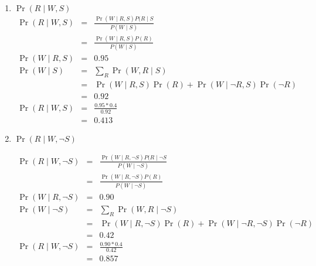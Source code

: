\documentclass[12pt]{article}
\begin{document}
\begin{enumerate}
\begin{enumerate}
\item $\Pr(R \mid W,S)$
\begin{eqnarray*}
	\Pr(R \mid W,S)  &=& \frac{\Pr(W\mid R, S) P(R\mid S}{P(W\mid S)} \\
		&=& \frac{\Pr(W\mid R, S) P(R)}{P(W\mid S)} \\
	\Pr(W\mid R, S) &=& 0.95 \\
	\Pr(W\mid S) &=& \sum_R \Pr(W,R \mid S) \\
		&=& \Pr(W\mid R,S)\Pr(R) + \Pr(W\mid \lnot R,S) \Pr(\lnot R) \\
		&=& 0.92 \\
	\Pr(R \mid W,S)   &=& \frac{0.95 * 0.4}{0.92}\\
		&=& 0.413
\end{eqnarray*}

\item $\Pr(R \mid W, \lnot S)$

\begin{eqnarray*}
	\Pr(R \mid W,\lnot S)  &=& \frac{\Pr(W\mid R, \lnot S) P(R\mid \lnot S}{P(W\mid \lnot S)} \\
		&=& \frac{\Pr(W\mid R, \lnot S) P(R)}{P(W\mid \lnot S)} \\
	\Pr(W\mid R, \lnot S) &=& 0.90 \\
	\Pr(W\mid \lnot S) &=& \sum_R \Pr(W,R \mid \lnot S) \\
		&=& \Pr(W\mid R, \lnot S)\Pr(R) + \Pr(W\mid \lnot R, \lnot S) \Pr(\lnot R) \\
		&=& 0.42  \\
	\Pr(R \mid W, \lnot S)   &=& \frac{0.90 * 0.4}{0.42}\\
		&=& 0.857
\end{eqnarray*}


\end{enumerate}

\end{enumerate}
\end{document}
